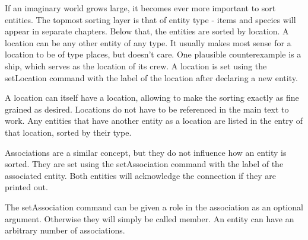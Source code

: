 \documentclass[openany]{memoir}
\begin{document}
If an imaginary world grows large, it becomes ever more important to sort entities. The topmost sorting layer is that of entity type - items and species will appear in separate chapters. Below that, the entities are sorted by location. A location can be any other entity of any type. It usually makes most sense for a location to be of type places, but \RpgTex{} doesn't care. One plausible counterexample is a ship, which serves as the location of its crew. A location is set using the setLocation command with the label of the location after declaring a new entity.

A location can itself have a location, allowing to make the sorting exactly as fine grained as desired. Locations do not have to be referenced in the main text to work. Any entities that have another entity as a location are listed in the entry of that location, sorted by their type.








Associations are a similar concept, but they do not influence how an entity is sorted. They are set using the setAssociation command with the label of the associated entity. Both entities will acknowledge the connection if they are printed out.

The setAssociation command can be given a role in the association as an optional argument. Otherwise they will simply be called member. An entity can have an arbitrary number of associations.









\automatedChapters{}
\end{document}
